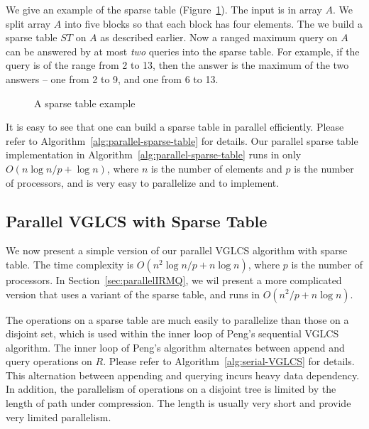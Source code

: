 We give an example of the sparse table
(Figure~\ref{fig:interval-decomposition}).  The input is in array
$A$. We split array $A$ into five blocks so that each block has four
elements.  The we build a sparse table $ST$ on $A$ as described
earlier.  Now a ranged maximum query on $A$ can be answered by at most
{\em two} queries into the sparse table.  For example, if the query is
of the range from 2 to 13, then the answer is the maximum of the two
answers -- one from 2 to 9, and one from 6 to 13.

\begin{figure}[!thb]
  \centering {} 
  \caption{A sparse table example}
  \label{fig:interval-decomposition}
\end{figure}

It is easy to see that one can build a sparse table in parallel
efficiently.  Please refer to
Algorithm~\ref{alg:parallel-sparse-table} for details.  Our parallel
sparse table implementation in
Algorithm~\ref{alg:parallel-sparse-table} runs in only $O(n \log n / p
+ \log n)$, where $n$ is the number of elements and $p$ is the number
of processors, and is very easy to parallelize and to implement.



\subsection{Parallel VGLCS with Sparse Table}

We now present a simple version of our parallel VGLCS algorithm with
sparse table.  The time complexity is $O(n^2 \log n / p + n \log n)$,
where $p$ is the number of processors.  In
Section~\ref{sec:parallelIRMQ}, we wil present a more complicated
version that uses a variant of the sparse table, and runs in $O(n^2 /
p + n \log n)$.

The operations on a sparse table are much easily to parallelize than
those on a disjoint set, which is used within the inner loop of Peng's
sequential VGLCS algorithm.  The inner loop of Peng's algorithm
alternates between append and query operations on $R$.  Please refer
to Algorithm~\ref{alg:serial-VGLCS} for details.  This alternation
between appending and querying incurs heavy data dependency.  In
addition, the parallelism of operations on a disjoint tree is limited
by the length of path under compression.  The length is usually very
short and provide very limited parallelism.

